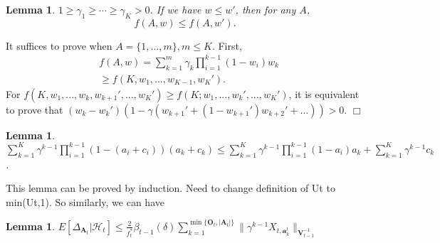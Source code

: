 \documentclass{article}
\newcommand{\bA}{\mathbf{A}}
\newcommand{\ba}{\mathbf{a}}
\newcommand{\bO}{\mathbf{O}}
\newcommand{\bV}{\mathbf{V}}
\newcommand{\cH}{\mathcal{H}}
\newcommand{\abs}[1]{\left| #1 \right|}
\newcommand{\norm}[1]{\| #1 \|}
\newtheorem{lemma}[theorem]{Lemma}%
\newenvironment{proof}{\noindent {\textbf{Proof. }}}{$\Box$ \medskip}
\begin{document}
\begin{lemma}
	$1\geq \gamma_1\geq \cdots \geq \gamma_K > 0$. If we have $w \leq w'$, then for any $A$,
	$$
		f(A, w) \leq f(A, w').
	$$
\end{lemma}
\begin{proof}
	It suffices to prove when $A = \{1,...,m\}, m\leq K$. First, 
	\begin{align*}
		& f(A, w)=\sum_{k=1}^m \gamma_k\prod_{i=1}^{k-1}(1-w_i)w_k\\
		&\geq f(K,w_1,...,w_{K-1},w_K'). 
	\end{align*}
	For $f(K, w_1,...,w_k,w_{k+1}',...,w_K')\geq f(K;w_1,...,w_k',...,w_K')$, it is equivalent to prove that $(w_k-w_k')(1-\gamma(w_{k+1}'+(1-w_{k+1}')w_{k+2}'+...))>0$.
\end{proof}

\begin{lemma}
	$\sum_{k=1}^K \gamma^{k-1}\prod_{i=1}^{k-1}(1-(a_i+c_i))(a_k + c_k) \leq \sum_{k=1}^K \gamma^{k-1}\prod_{i=1}^{k-1}(1-a_i)a_k + \sum_{k=1}^K \gamma^{k-1}c_k$.
\end{lemma}
This lemma can be proved by induction. Need to change definition of Ut to min(Ut,1). So similarly, we can have

\begin{lemma}
	$E[\Delta_{\bA_t}|\cH_t] \leq \frac{2}{f_t^*} \beta_{t-1}(\delta)\sum_{k=1}^{\min\{\bO_t, \abs{\bA_t}\}}\norm{\gamma^{k-1}X_{t,\ba_k^t}}_{\bV_{t-1}^{-1}}$
\end{lemma}



\nocite{langley00}



\end{document}
